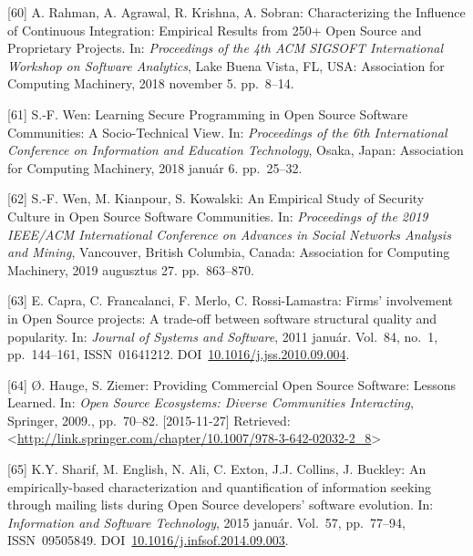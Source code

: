\documentclass[12pt,magyar,a4paper,oneside]{scrreprt}
\newenvironment{cslreferences}%
  {}%
  {\par}
\begin{document}
\begin{cslreferences}
\leavevmode\hypertarget{ref-rahman_characterizing_2018}{}%
{[}60{]} A. Rahman, A. Agrawal, R. Krishna, A. Sobran: Characterizing
the Influence of Continuous Integration: Empirical Results from 250+
Open Source and Proprietary Projects. In: \emph{Proceedings of the 4th
ACM SIGSOFT International Workshop on Software Analytics}, Lake Buena
Vista, FL, USA: Association for Computing Machinery, 2018 november 5.
pp.~8--14.

\leavevmode\hypertarget{ref-wen_learning_2018}{}%
{[}61{]} S.-F. Wen: Learning Secure Programming in Open Source Software
Communities: A Socio-Technical View. In: \emph{Proceedings of the 6th
International Conference on Information and Education Technology},
Osaka, Japan: Association for Computing Machinery, 2018 január 6.
pp.~25--32.

\leavevmode\hypertarget{ref-wen_empirical_2019}{}%
{[}62{]} S.-F. Wen, M. Kianpour, S. Kowalski: An Empirical Study of
Security Culture in Open Source Software Communities. In:
\emph{Proceedings of the 2019 IEEE/ACM International Conference on
Advances in Social Networks Analysis and Mining}, Vancouver, British
Columbia, Canada: Association for Computing Machinery, 2019 augusztus
27. pp.~863--870.

\leavevmode\hypertarget{ref-capra_firms_2011}{}%
{[}63{]} E. Capra, C. Francalanci, F. Merlo, C. Rossi-Lamastra: Firms'
involvement in Open Source projects: A trade-off between software
structural quality and popularity. In: \emph{Journal of Systems and
Software}, 2011 január. Vol.~84, no.~1, pp.~144--161, ISSN~01641212.
DOI~\href{https://doi.org/10.1016/j.jss.2010.09.004}{10.1016/j.jss.2010.09.004}.

\leavevmode\hypertarget{ref-hauge_providing_2009}{}%
{[}64{]} Ø. Hauge, S. Ziemer: Providing Commercial Open Source Software:
Lessons Learned. In: \emph{Open Source Ecosystems: Diverse Communities
Interacting}, Springer, 2009., pp.~70--82. {[}2015-11-27{]} Retrieved:
\textless{}\url{http://link.springer.com/chapter/10.1007/978-3-642-02032-2_8}\textgreater{}

\leavevmode\hypertarget{ref-sharif_empirically-based_2015}{}%
{[}65{]} K.Y. Sharif, M. English, N. Ali, C. Exton, J.J. Collins, J.
Buckley: An empirically-based characterization and quantification of
information seeking through mailing lists during Open Source developers'
software evolution. In: \emph{Information and Software Technology}, 2015
január. Vol.~57, pp.~77--94, ISSN~09505849.
DOI~\href{https://doi.org/10.1016/j.infsof.2014.09.003}{10.1016/j.infsof.2014.09.003}.


\end{cslreferences}
\end{document}

